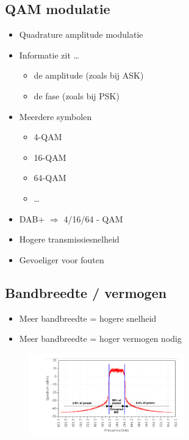 \documentclass{article}
\begin{document}
\subsection{QAM modulatie}
\begin{itemize}
    \item Quadrature amplitude modulatie
    \item Informatie zit \dots
    \begin{itemize}
        \item de amplitude (zoals bij ASK)
        \item de fase (zoals bij PSK)
    \end{itemize}
    \item Meerdere symbolen
    \begin{itemize}
        \item 4-QAM
        \item 16-QAM
        \item 64-QAM
        \item \dots
    \end{itemize}
    \item DAB+ $\Rightarrow$ 4/16/64 - QAM
    \item Hogere transmissiesnelheid
    \item Gevoeliger voor fouten
\end{itemize}

\subsection{Bandbreedte / vermogen}
\begin{itemize}
    \item Meer bandbreedte = hogere snelheid
    \item Meer bandbreedte = hoger vermogen nodig
\end{itemize}

\begin{figure}[H]
    \centering
    \includegraphics[width=0.6\textwidth]{Screenshot_20200302_122703.png}
    \caption{}
\end{figure}
\end{document}
